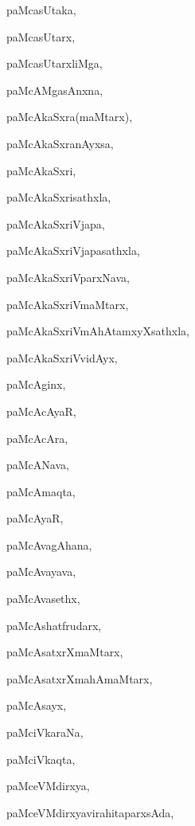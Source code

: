 \begin{multicols}{2}
{paMcasUtaka}, \pageref{paMcasUtaka}

{paMcasUtarx}, \pageref{paMcasUtarx}

{paMcasUtarxliMga}, \pageref{paMcasUtarxliMga}

{paMcAMgasAnxna}, \pageref{paMcAMgasAnxna}

{paMcAkaSxra(maMtarx)}, \pageref{paMcAkaSxramaMtarx}

{paMcAkaSxranAyxsa}, \pageref{paMcAkaSxranAyxsa}

{paMcAkaSxri}, \pageref{paMcAkaSxri}

{paMcAkaSxrisathxla}, \pageref{paMcAkaSxrisathxla}

{paMcAkaSxriVjapa}, \pageref{paMcAkaSxriVjapa}

{paMcAkaSxriVjapasathxla}, \pageref{paMcAkaSxriVjapasathxla}

{paMcAkaSxriVparxNava}, \pageref{paMcAkaSxriVparxNava}

{paMcAkaSxriVmaMtarx}, \pageref{paMcAkaSxriVmaMtarx}

{paMcAkaSxriVmAhAtamxyXsathxla}, \pageref{paMcAkaSxriVmAhAtamxyXsathxla}

{paMcAkaSxriVvidAyx}, \pageref{paMcAkaSxriVvidAyx}

{paMcAginx}, \pageref{paMcAginx}

{paMcAcAyaR}, \pageref{paMcAcAyaR}

{paMcAcAra}, \pageref{paMcAcAra}

{paMcANava}, \pageref{paMcANava}

{paMcAmaqta}, \pageref{paMcAmaqta}

{paMcAyaR}, \pageref{paMcAyaR}

{paMcAvagAhana}, \pageref{paMcAvagAhana}

{paMcAvayava}, \pageref{paMcAvayava}

{paMcAvasethx}, \pageref{paMcAvasethx}

{paMcAshatfrudarx}, \pageref{paMcAshatfrudarx}

{paMcAsatxrXmaMtarx}, \pageref{paMcAsatxrXmaMtarx}

{paMcAsatxrXmahAmaMtarx}, \pageref{paMcAsatxrXmahAmaMtarx}

{paMcAsayx}, \pageref{paMcAsayx}

{paMciVkaraNa}, \pageref{paMciVkaraNa}

{paMciVkaqta}, \pageref{paMciVkaqta}

{paMceVMdirxya}, \pageref{paMceVMdirxya}

{paMceVMdirxyavirahitaparxsAda}, \pageref{paMceVMdirxyavirahitaparxsAda}


\end{multicols}
